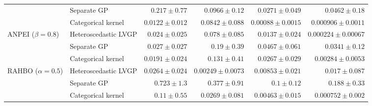 \begin{table}[htbp]
\begin{tabular}{llrrrr}
 & Separate GP & $0.217 \pm 0.77$ & $0.0966 \pm 0.12$ & $0.0271 \pm 0.049$ & $0.0462 \pm 0.18$ \\
 & Categorical kernel & {\boldmath$0.0122 \pm 0.012$} & {\boldmath$0.0842 \pm 0.088$} & {\boldmath$0.00088 \pm 0.0015$} & $0.000906 \pm 0.0011$ \\
\midrule
ANPEI ($\beta=0.8$) & Heteroscedastic LVGP & $0.024 \pm 0.025$ & {\boldmath$0.078 \pm 0.085$} & {\boldmath$0.0137 \pm 0.024$} & {\boldmath$0.000224 \pm 0.00067$} \\
 & Separate GP & $0.027 \pm 0.027$ & $0.19 \pm 0.39$ & $0.0467 \pm 0.061$ & $0.0341 \pm 0.12$ \\
 & Categorical kernel & {\boldmath$0.0191 \pm 0.024$} & $0.131 \pm 0.41$ & $0.0267 \pm 0.029$ & $0.00284 \pm 0.0053$ \\
\midrule
RAHBO ($\alpha=0.5$) & Heteroscedastic LVGP & {\boldmath$0.0264 \pm 0.024$} & \colorbox{green!20}{{\boldmath$0.00249 \pm 0.0073$}} & $0.00853 \pm 0.021$ & $0.017 \pm 0.087$ \\
 & Separate GP & $0.723 \pm 1.3$ & $0.377 \pm 0.91$ & $0.1 \pm 0.12$ & $0.188 \pm 0.33$ \\
 & Categorical kernel & $0.11 \pm 0.55$ & $0.0269 \pm 0.081$ & {\boldmath$0.00463 \pm 0.015$} & {\boldmath$0.000752 \pm 0.002$} \\
\bottomrule
\end{tabular}
\end{table}
